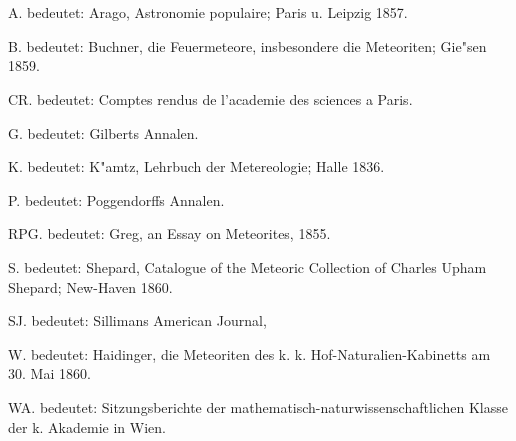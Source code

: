 \documentclass[a4paper, 8pt, oneside, polutonikogreek, german]{article}
\begin{document}
\section*{}
\hspace*{5mm}A. bedeutet: Arago, Astronomie populaire; Paris u. Leipzig 1857.

B. bedeutet: Buchner, die Feuermeteore, insbesondere die Meteoriten; Gie"sen 1859.

CR. bedeutet: Comptes rendus de l’academie des sciences a Paris.

G. bedeutet: Gilberts Annalen.

K. bedeutet: K"amtz, Lehrbuch der Metereologie; Halle 1836.

P. bedeutet: Poggendorffs Annalen.

RPG. bedeutet: Greg, an Essay on Meteorites, 1855.

S. bedeutet: Shepard, Catalogue of the Meteoric Collection of Charles Upham Shepard; New-Haven 1860.

SJ. bedeutet: Sillimans American Journal,

W. bedeutet: Haidinger, die Meteoriten des k. k. Hof-Naturalien-Kabinetts am 30. Mai 1860.

WA. bedeutet: Sitzungsberichte der mathematisch-naturwissenschaftlichen Klasse der k. Akademie in Wien.
\end{document}
